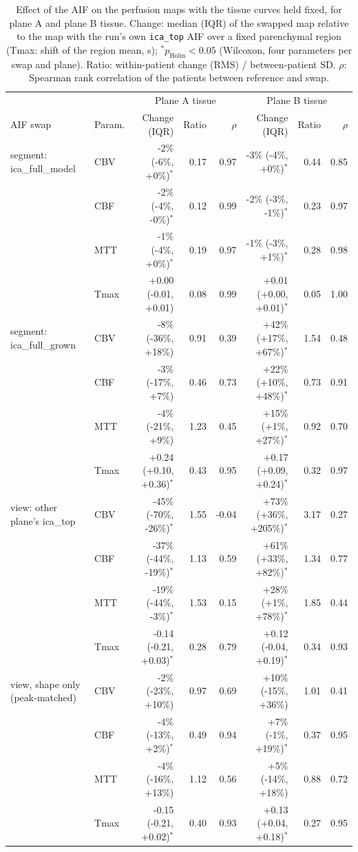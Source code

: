 \begin{table}[t]
\centering
\caption{Effect of the AIF on the perfusion maps with the tissue curves held fixed, for plane A and plane B tissue. Change: median (IQR) of the swapped map relative to the map with the run's own \texttt{ica\_top} AIF over a fixed parenchymal region (Tmax: shift of the region mean, s); $^\ast p_\mathrm{Holm} < 0.05$ (Wilcoxon, four parameters per swap and plane). Ratio: within-patient change (RMS) / between-patient SD. $\rho$: Spearman rank correlation of the patients between reference and swap.}
\label{tab:sq4}
\footnotesize
\begin{tabular}{ll rrr rrr}
\hline
 & & \multicolumn{3}{c}{Plane A tissue} & \multicolumn{3}{c}{Plane B tissue} \\
AIF swap & Param. & Change (IQR) & Ratio & $\rho$ & Change (IQR) & Ratio & $\rho$ \\
\hline
segment: ica_full_model & CBV & -2\% (-6\%, +0\%)$^\ast$ & 0.17 & 0.97 & -3\% (-4\%, +0\%)$^\ast$ & 0.44 & 0.85 \\
 & CBF & -2\% (-4\%, -0\%)$^\ast$ & 0.12 & 0.99 & -2\% (-3\%, -1\%)$^\ast$ & 0.23 & 0.97 \\
 & MTT & -1\% (-4\%, +0\%)$^\ast$ & 0.19 & 0.97 & -1\% (-3\%, +1\%)$^\ast$ & 0.28 & 0.98 \\
 & Tmax & +0.00 (-0.01, +0.01) & 0.08 & 0.99 & +0.01 (+0.00, +0.01)$^\ast$ & 0.05 & 1.00 \\
\hline
segment: ica_full_grown & CBV & -8\% (-36\%, +18\%) & 0.91 & 0.39 & +42\% (+17\%, +67\%)$^\ast$ & 1.54 & 0.48 \\
 & CBF & -3\% (-17\%, +7\%) & 0.46 & 0.73 & +22\% (+10\%, +48\%)$^\ast$ & 0.73 & 0.91 \\
 & MTT & -4\% (-21\%, +9\%) & 1.23 & 0.45 & +15\% (+1\%, +27\%)$^\ast$ & 0.92 & 0.70 \\
 & Tmax & +0.24 (+0.10, +0.36)$^\ast$ & 0.43 & 0.95 & +0.17 (+0.09, +0.24)$^\ast$ & 0.32 & 0.97 \\
\hline
view: other plane's ica_top & CBV & -45\% (-70\%, -26\%)$^\ast$ & 1.55 & -0.04 & +73\% (+36\%, +205\%)$^\ast$ & 3.17 & 0.27 \\
 & CBF & -37\% (-44\%, -19\%)$^\ast$ & 1.13 & 0.59 & +61\% (+33\%, +82\%)$^\ast$ & 1.34 & 0.77 \\
 & MTT & -19\% (-44\%, -3\%)$^\ast$ & 1.53 & 0.15 & +28\% (+1\%, +78\%)$^\ast$ & 1.85 & 0.44 \\
 & Tmax & -0.14 (-0.21, +0.03)$^\ast$ & 0.28 & 0.79 & +0.12 (-0.04, +0.19)$^\ast$ & 0.34 & 0.93 \\
\hline
view, shape only (peak-matched) & CBV & -2\% (-23\%, +10\%) & 0.97 & 0.69 & +10\% (-15\%, +36\%) & 1.01 & 0.41 \\
 & CBF & -4\% (-13\%, +2\%)$^\ast$ & 0.49 & 0.94 & +7\% (-1\%, +19\%)$^\ast$ & 0.37 & 0.95 \\
 & MTT & -4\% (-16\%, +13\%) & 1.12 & 0.56 & +5\% (-14\%, +18\%) & 0.88 & 0.72 \\
 & Tmax & -0.15 (-0.21, +0.02)$^\ast$ & 0.40 & 0.93 & +0.13 (+0.04, +0.18)$^\ast$ & 0.27 & 0.95 \\
\hline
\end{tabular}
\end{table}
